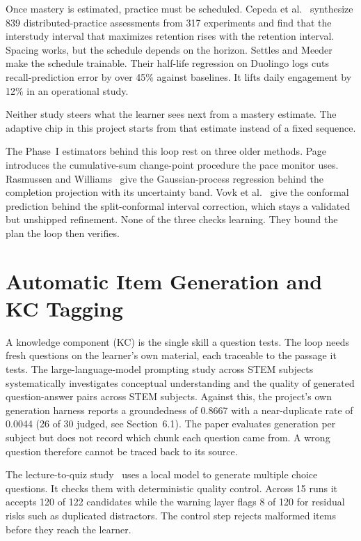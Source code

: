 Once mastery is estimated, practice must be scheduled. Cepeda et al.~\cite{cepeda2006} synthesize 839 distributed-practice assessments from 317 experiments and find that the interstudy interval that maximizes retention rises with the retention interval. Spacing works, but the schedule depends on the horizon. Settles and Meeder~\cite{settles2016} make the schedule trainable. Their half-life regression on Duolingo logs cuts recall-prediction error by over 45\% against baselines. It lifts daily engagement by 12\% in an operational study.

Neither study steers what the learner sees next from a mastery estimate. The adaptive chip in this project starts from that estimate instead of a fixed sequence.

The Phase~I estimators behind this loop rest on three older methods. Page~\cite{page1954} introduces the cumulative-sum change-point procedure the pace monitor uses. Rasmussen and Williams~\cite{rasmussen2006} give the Gaussian-process regression behind the completion projection with its uncertainty band. Vovk et al.~\cite{vovk2005} give the conformal prediction behind the split-conformal interval correction, which stays a validated but unshipped refinement. None of the three checks learning. They bound the plan the loop then verifies.

\section{Automatic Item Generation and KC Tagging}
A knowledge component (KC) is the single skill a question tests. The loop needs fresh questions on the learner's own material, each traceable to the passage it tests. The large-language-model prompting study across STEM subjects~\cite{itemgen2024} systematically investigates conceptual understanding and the quality of generated question-answer pairs across STEM subjects. Against this, the project's own generation harness reports a groundedness of 0.8667 with a near-duplicate rate of 0.0044 (26 of 30 judged, see Section~6.1). The paper evaluates generation per subject but does not record which chunk each question came from. A wrong question therefore cannot be traced back to its source.

The lecture-to-quiz study~\cite{lecturequiz2026} uses a local model to generate multiple choice questions. It checks them with deterministic quality control. Across 15 runs it accepts 120 of 122 candidates while the warning layer flags 8 of 120 for residual risks such as duplicated distractors. The control step rejects malformed items before they reach the learner.


